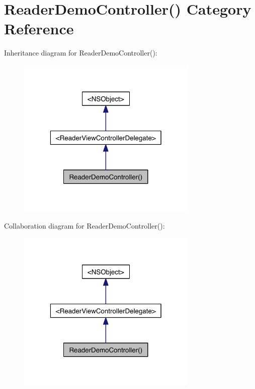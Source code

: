 \hypertarget{category_reader_demo_controller_07_08}{\section{Reader\-Demo\-Controller() Category Reference}
\label{d8/d29/category_reader_demo_controller_07_08}
}


Inheritance diagram for Reader\-Demo\-Controller()\-:
\nopagebreak
\begin{figure}[H]
\begin{center}
\leavevmode
\includegraphics[width=244pt]{d0/db0/category_reader_demo_controller_07_08__inherit__graph}
\end{center}
\end{figure}


Collaboration diagram for Reader\-Demo\-Controller()\-:
\nopagebreak
\begin{figure}[H]
\begin{center}
\leavevmode
\includegraphics[width=244pt]{d4/d63/category_reader_demo_controller_07_08__coll__graph}
\end{center}
\end{figure}
